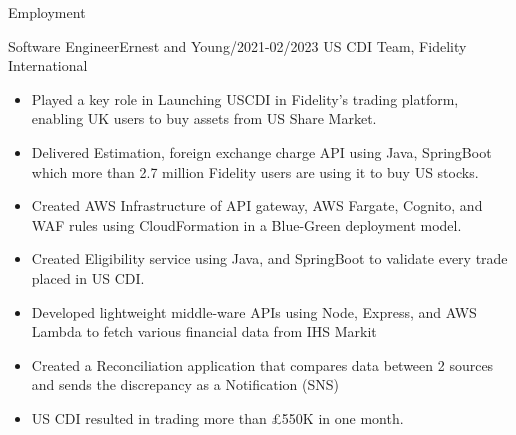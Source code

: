 \documentclass[]{mcdowellcv}
\begin{document}
\begin{cvsection}{Employment}
        \begin{cvsubsection}{Software Engineer}{Ernest and Young}{/2021-02/2023}
            US CDI Team,    Fidelity International
            \begin{itemize}
                \item Played a key role in Launching USCDI in Fidelity's trading platform, enabling UK users to buy assets from US Share Market.
                \item Delivered Estimation, foreign exchange charge API using Java, SpringBoot which more than 2.7 million
                Fidelity users are using it to buy US stocks.
                \item Created AWS Infrastructure of API gateway, AWS Fargate, Cognito, and WAF rules using CloudFormation in a Blue-Green deployment model.
                \item Created Eligibility service using Java, and SpringBoot to validate every trade placed in US CDI.
                \item Developed lightweight middle-ware APIs using Node, Express, and AWS Lambda to fetch various financial data from IHS Markit
                \item Created a Reconciliation application that compares data between 2 sources and sends the discrepancy as a
                Notification (SNS)
                \item US CDI resulted in trading more than £550K in one month.
            \end{itemize}
        \end{cvsubsection}
%

\end{cvsection}
\end{document}
